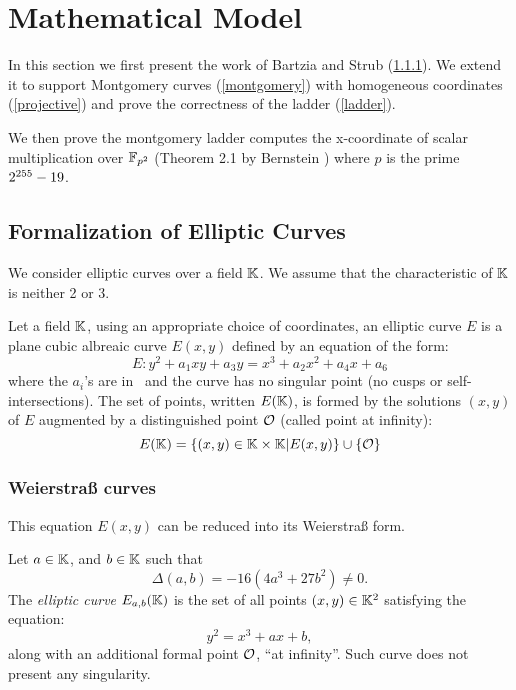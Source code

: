 \section{Mathematical Model}

In this section we first present the work of Bartzia and Strub \cite{DBLP:conf/itp/BartziaS14} (\ref{Weierstrass}).
We extend it to support Montgomery curves (\ref{montgomery}) with homogeneous coordinates (\ref{projective}) and prove the correctness of the ladder (\ref{ladder}).

We then prove the montgomery ladder computes
the x-coordinate of scalar multiplication over $\mathbb{F}_{p^2}$
(Theorem 2.1 by Bernstein \cite{Ber06}) where $p$ is the prime $2^{255}-19$.

\subsection{Formalization of Elliptic Curves}

We consider elliptic curves over a field $\mathbb{K}$. We assume that the
characteristic of $\mathbb{K}$ is neither 2 or 3.

\begin{definition}
Let a field $\mathbb{K}$, using an appropriate choice of coordinates, an elliptic curve $E$
is a plane cubic albreaic curve $E(x,y)$ defined by an equation of the form:
$$E : y^2 + a_1 xy + a_3 y = x^3 + a_2 x^2 + a_4 x + a_6$$
where the $a_i$'s are in \K\ and the curve has no singular point (\ie no cusps
or self-intersections). The set of points, written $E(\mathbb{K})$, is formed by the
solutions $(x,y)$ of $E$ augmented by a distinguished point $\mathcal{O}$ (called point at infinity):
$$E(\mathbb{K}) = \{(x,y) \in \mathbb{K} \times \mathbb{K} | E(x,y)\} \cup \{\mathcal{O}\}$$
\end{definition}

\subsubsection{Weierstra{\ss} curves}
\label{Weierstrass}
This equation $E(x,y)$ can be reduced into its Weierstra{\ss} form.

\begin{definition}
Let $a \in \mathbb{K}$, and $b \in \mathbb{K}$ such that $$\Delta(a,b) = -16(4a^3 + 27b^2) \neq 0.$$ The \textit{elliptic curve} $E_{a,b}(\mathbb{K})$ is the set of all points $(x,y) \in \mathbb{K}^2$ satisfying the equation:
$$y^2 = x^3 + ax + b,$$
along with an additional formal point $\mathcal{O}$, ``at infinity''. Such curve does not present any singularity.
\end{definition}

